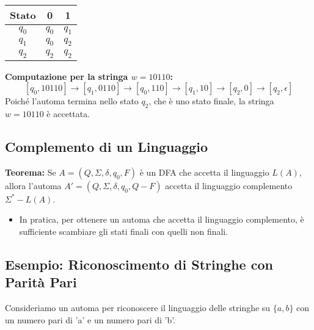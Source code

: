 \begin{center}
\begin{tabular}{|c|c|c|}
    \hline
    \textbf{Stato} & \textbf{0} & \textbf{1} \\
    \hline
    $q_0$ & $q_0$ & $q_1$ \\
    \hline
    $q_1$ & $q_0$ & $q_2$ \\
    \hline
    $q_2$ & $q_2$ & $q_2$ \\
    \hline
\end{tabular}
\end{center}

\textbf{Computazione per la stringa $w = 10110$:}
\[ [q_0, 10110] \rightarrow [q_1, 0110] \rightarrow [q_0, 110] \rightarrow [q_1, 10] \rightarrow [q_2, 0] \rightarrow [q_2, \epsilon] \]
Poiché l'automa termina nello stato $q_2$, che è uno stato finale, la stringa $w=10110$ è accettata.

\begin{center}
    \end{center}

\subsection{Complemento di un Linguaggio}
\textbf{Teorema:} Se $A = (Q, \Sigma, \delta, q_0, F)$ è un DFA che accetta il linguaggio $L(A)$, allora l'automa $A' = (Q, \Sigma, \delta, q_0, Q-F)$ accetta il linguaggio complemento $\Sigma^* - L(A)$.
\begin{itemize}
    \item In pratica, per ottenere un automa che accetta il linguaggio complemento, è sufficiente scambiare gli stati finali con quelli non finali.
\end{itemize}

\subsection{Esempio: Riconoscimento di Stringhe con Parità Pari}
Consideriamo un automa per riconoscere il linguaggio delle stringhe su $\{a,b\}$ con un numero pari di 'a' e un numero pari di 'b'.

